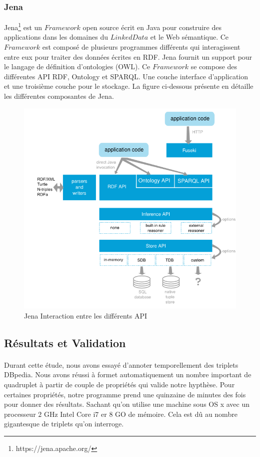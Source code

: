 \documentclass[12pt,a4	]{report}
\begin{document}
\subsubsection*{Jena}
Jena\footnote{https://jena.apache.org/} est un $Framework$ open source écrit en Java pour construire des applications dans les domaines du
$LinkedData$ et le Web sémantique. Ce $Framework$ est composé de plusieurs programmes différents qui interagissent entre eux pour traiter des données écrites en RDF. Jena fournit un support pour le langage de définition d'ontologies (OWL). Ce $Framework$ se compose des différentes API RDF, Ontology et SPARQL. Une couche interface d'application et une troisième couche pour le stockage. La figure ci-dessous présente en détaille les différentes composantes de Jena.
 \begin{figure}[H]
        \centering
                \includegraphics[width=13cm]{Jena.png}
               \caption{Jena Interaction entre les différents API}
\end{figure}
\subsection*{Résultats et Validation}
\paragraph{}
Durant cette étude, nous avons essayé d'annoter temporellement des triplets DBpedia. Nous avons réussi à formet automatiquement un nombre important de quadruplet à partir de couple de propriétés qui valide notre hypthèse. Pour certaines propriétés, notre programme prend une quinzaine de minutes des fois pour donner des résultats. Sachant qu'on utilise une machine sous OS x avec un processeur $2$ GHz Intel Core i$7$ er $8$ GO de mémoire. Cela est dû au nombre gigantesque de triplets qu'on interroge.
\end{document}
